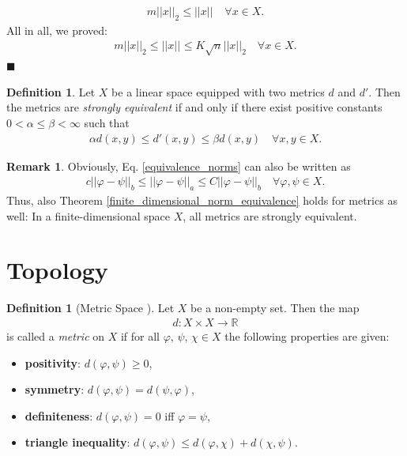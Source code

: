 \documentclass[12pt, a4paper]{article}
\numberwithin{equation}{section}
\theoremstyle{definition}
\theoremstyle{definition}
\newtheorem{defn}[thm]{Definition} %
\newtheorem{remark}[thm]{Remark} %
\newcommand{\norm}[2]{\left\vert\left\vert #1 \right\vert\right\vert_{#2}}
\begin{document}
	\begin{align}
		m\norm{x}{2} \leq \norm{x}{} \quad \forall x\in X.
	\end{align}
	All in all, we proved: 
	\begin{align}
		m\norm{x}{2} \leq \norm{x}{} \leq K\sqrt{n}\norm{x}{2} \quad \forall x\in X. 
	\end{align}
	\qquad\qquad\qquad\qquad\qquad\qquad\qquad\qquad\qquad\qquad\qquad\qquad\qquad\qquad\qquad\qquad\qquad\qquad\qquad\qquad\qquad\quad$\blacksquare$
	
	\begin{defn}\label{defn:strong_equivalence}
		Let $X$ be a linear space equipped with two metrics $d$ and $d'$. Then the metrics are \textit{strongly equivalent} if and only if there exist positive constants $0 < \alpha \leq \beta < \infty$ such that 
		\begin{align}
			\alpha d(x, y) \leq d'(x, y) \leq \beta d(x, y) \quad\forall x, y\in X. 
		\end{align}
		\cite{equivalence-metrics}
	\end{defn}
	
	\begin{remark}\label{equivalence_metrics_finite_dimensional}
		Obviously, Eq. \eqref{equivalence_norms} can also be written as 
		\begin{align}
			c\norm{\varphi-\psi}{b} \leq \norm{\varphi-\psi}{a} \leq C\norm{\varphi-\psi}{b} \quad \forall \varphi, \psi\in X. 
		\end{align} 
		Thus, also Theorem \ref{finite_dimensional_norm_equivalence} holds for metrics as well: In a finite-dimensional space $X$, all metrics are strongly equivalent. 
	\end{remark}
	
	\newpage 
	\section{Topology}
	\begin{defn}[Metric Space \cite{fa2019}]\label{defn:metric_space}
		Let $X$ be a non-empty set. Then the map 
		\begin{align*}
			d: X\times X\rightarrow \mathbb R
		\end{align*}
		is called a \textit{metric} on $X$ if for all $\varphi$, $\psi$, $\chi\in X$ the following properties are given: 
		\begin{itemize}
			\item \textbf{positivity}: $d(\varphi, \psi) \geq 0$, 
			\item \textbf{symmetry}: $d(\varphi, \psi) = d(\psi, \varphi)$, 
			\item \textbf{definiteness}: $d(\varphi, \psi) = 0$ iff $\varphi = \psi$, 
			\item \textbf{triangle inequality}: $d(\varphi, \psi) \leq d(\varphi, \chi) + d(\chi, \psi)$. 
		\end{itemize}
	\end{defn}
\end{document}
